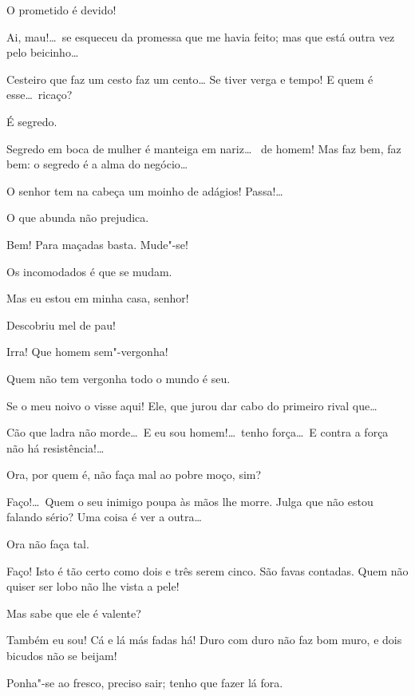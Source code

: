   O prometido é devido!

  Ai, mau!\ldots\ se esqueceu da promessa que me havia feito; mas
que está outra vez pelo beicinho\ldots

  Cesteiro que faz um cesto faz um cento\ldots {} Se tiver verga e tempo! E quem é esse\ldots\ ricaço?

  É segredo.

  Segredo em boca de mulher é manteiga em nariz\ldots\  de homem! Mas faz bem, faz bem: o segredo é a alma do
negócio\ldots

  O senhor tem na cabeça um moinho de adágios! Passa!\ldots

  O que abunda não prejudica.

  Bem! Para maçadas basta. Mude"-se!

  Os incomodados é que se mudam.

  Mas eu estou em minha casa, senhor!

  Descobriu mel de pau!

  Irra! Que homem sem"-vergonha!

   Quem não tem vergonha
todo o mundo é seu.

  Se o meu noivo o visse aqui! Ele, que jurou dar cabo do primeiro
rival que\ldots

  Cão que ladra não morde\ldots\ E eu sou homem!\ldots\ tenho
força\ldots\ E contra a força não há resistência!\ldots

   Ora, por quem é, não faça mal ao pobre moço, sim?

  Faço!\ldots\ Quem o seu inimigo poupa às mãos lhe morre.  Julga
que não estou falando sério? Uma coisa é ver a outra\ldots

   Ora não faça tal.

  Faço! Isto é tão certo como dois e três serem cinco. São favas
contadas.
Quem não quiser ser lobo não lhe vista a pele!

  Mas sabe que ele é valente?

  Também eu sou! Cá e lá más fadas há! Duro com duro não faz bom
muro, e dois bicudos não se beijam!

  Ponha"-se ao fresco, preciso sair; tenho que fazer lá fora.

